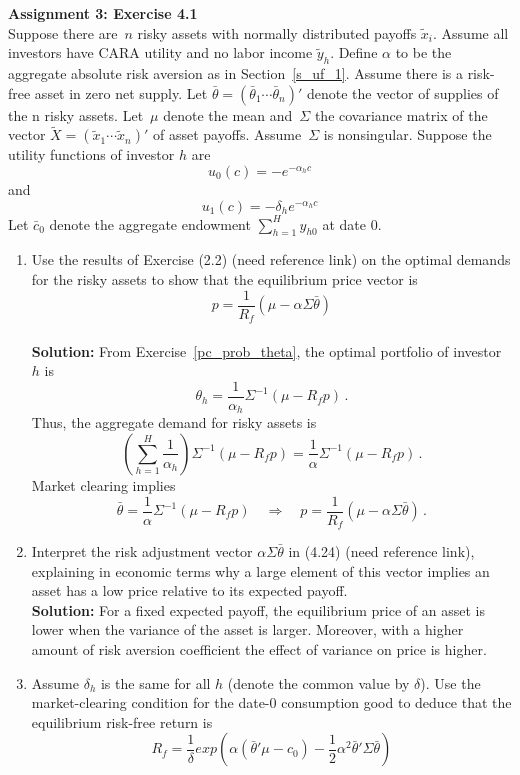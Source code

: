 \documentclass[11pt]{article}
\newcommand{\sol}{\textbf{Solution:} \hspace{2ex}}
\theoremstyle{definition}
\begin{document}
\begin{enumerate}
\newpage\noindent \textbf{Assignment 3: Exercise 4.1}\\
\noindent 
	Suppose there are~$n$ risky assets with normally distributed payoffs $\tilde{x}_i$. Assume all investors have CARA utility and no labor income $\tilde{y}_h$. Define $\alpha $ to be the aggregate absolute risk aversion as in Section~\ref{s_uf_1}. Assume there is a risk-free asset in zero net supply. Let $\bar{\theta} = (\bar{\theta}_1 \cdots \bar{\theta}_n)'$ denote the vector of supplies of the n risky assets. Let~$\mu$ denote the mean and~$\Sigma$ the covariance matrix of the vector $\tilde{X}=(\tilde{x}_1 \cdots \tilde{x}_n)'$ of asset payoffs. Assume~$\Sigma$ is nonsingular. Suppose the utility functions of investor $h$ are
	$$u_0(c)=-e^{-\alpha_hc} $$ and $$ u_1(c)=-\delta_h e^{-\alpha_hc}$$ 
	Let $\bar{c}_0$ denote the aggregate endowment $\sum_{h=1}^H y_{h0}$ at date 0. 
	\begin{enumerate}\renewcommand{\labelenumi}{(\alph{enumi})}
		\item Use the results of Exercise (2.2) (need reference link) on the optimal demands for the risky assets to show that the equilibrium price vector is
		$$p = \frac{1}{R_f}\left(\mu - \alpha \Sigma \bar{\theta}\right)$$\\
		\noindent\sol From Exercise~\ref{pc_prob_theta}, the optimal portfolio of investor $h$ is
		$$\theta_h =  \frac{1}{\alpha_h }\Sigma^{-1}(\mu-R_fp)\,.$$
		Thus, the aggregate demand for risky assets is
		$$\left(\sum_{h=1}^H\frac{1}{\alpha_h}\right)\Sigma^{-1}(\mu-R_fp) = \frac{1}{\alpha}\Sigma^{-1}(\mu-R_fp)\,.$$
		Market clearing implies
		$$\bar{\theta} = \frac{1}{\alpha}\Sigma^{-1}(\mu-R_fp) \quad \Rightarrow \quad p = \frac{1}{R_f}(\mu-\alpha\Sigma\bar{\theta})\,.$$
		\item Interpret the risk adjustment vector $\alpha\Sigma\bar{\theta}$ in (4.24) (need reference link), explaining in economic terms why a large element of this vector implies an asset has a low price relative to its expected payoff.\\
		\noindent\sol For a fixed expected payoff, the equilibrium price of an asset is lower when the variance of the asset is larger. Moreover, with a higher amount of risk aversion coefficient the effect of variance on price is higher. 
		\item Assume $\delta_h$ is the same for all $h$ (denote the common value by $\delta$). Use the market-clearing condition for the date-0 consumption good to deduce that the equilibrium risk-free return is
		$$R_f=\frac{1}{\delta}exp\left( \alpha\left( \bar{\theta}'\mu-c_0\right) -\frac{1}{2}\alpha^2\bar{\theta}'\Sigma \bar{\theta}\right) $$

\end{enumerate}
\end{enumerate}
\end{document}
